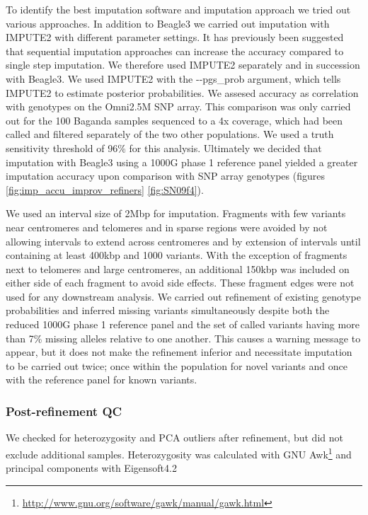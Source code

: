To identify the best imputation software and imputation approach we tried out various approaches. In addition to Beagle3 we carried out imputation with IMPUTE2\cite{10.1371/journal.pgen.1000529} with different parameter settings. It has previously been suggested that sequential imputation approaches can increase the accuracy compared to single step imputation.\cite{Pasaniuc2012}
We therefore used IMPUTE2 separately and in succession with Beagle3. We used IMPUTE2 with the -{}-pgs\_prob argument, which tells IMPUTE2 to estimate posterior probabilities. We assesed accuracy as correlation with genotypes on the Omni2.5M SNP array. This comparison was only carried out for the 100 Baganda samples sequenced to a 4x coverage, which had been called and filtered separately of the two other populations. We used a truth sensitivity threshold of 96\% for this analysis.
Ultimately we decided that imputation with Beagle3\cite{Browning20071084} using a \gls{1000G} phase 1 reference panel yielded a greater imputation accuracy upon comparison with SNP array genotypes (figures \ref{fig:imp_accu_improv_refiners} \ref{fig:SN09f4}).


We used an interval size of 2\gls{Mbp} for imputation. Fragments with few variants near centromeres and telomeres and in sparse regions were avoided by not allowing intervals to extend across centromeres and by extension of intervals until containing at least 400\gls{kbp} and 1000 variants. With the exception of fragments next to telomeres and large centromeres, an additional 150\gls{kbp} was included on either side of each fragment to avoid side effects. These fragment edges were not used for any downstream analysis.
We carried out refinement of existing genotype probabilities and inferred missing variants simultaneously despite both the reduced \gls{1000G} phase 1 reference panel and the set of called variants having more than 7\% missing alleles relative to one another. This causes a warning message to appear, but it does not make the refinement inferior and necessitate imputation to be carried out twice; once within the population for novel variants and once with the reference panel for known variants.

\subsubsection{Post-refinement \gls{QC}}
We checked for heterozygosity and \gls{PCA} outliers after refinement, but did not exclude additional samples. Heterozygosity was calculated with GNU Awk\footnote{\url{http://www.gnu.org/software/gawk/manual/gawk.html}} and principal components with Eigensoft4.2\cite{10.1371/journal.pgen.0020190}\cite{Price2006}

